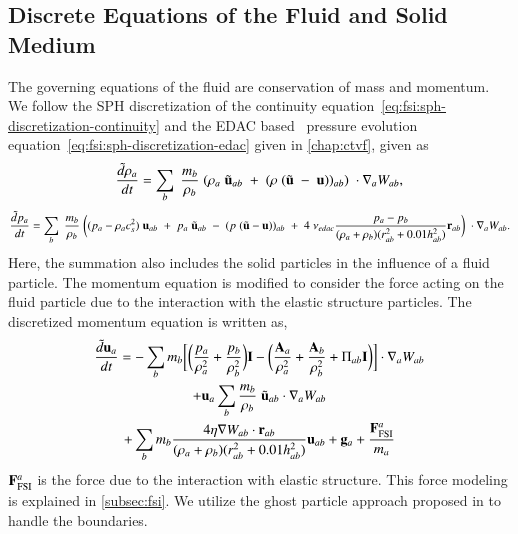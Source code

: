 \subsection{Discrete Equations of the Fluid and Solid Medium}\label{subsec:discrete-fluid}
The governing equations of the fluid are conservation of mass and momentum. We
follow the SPH discretization of the continuity
equation~\eqref{eq:fsi:sph-discretization-continuity} and the EDAC
based~\citep{PRKP:edac-sph-iccm2015} pressure evolution
equation~\eqref{eq:fsi:sph-discretization-edac} given in \cref{chap:ctvf}, given
as
\begin{equation}
  \label{eq:fsi:sph-discretization-continuity}
  \frac{\tilde{d}\rho_a}{dt} = \sum_{b} \; \frac{m_b}{\rho_{b}} \; (
  \rho_{a} \; \tilde{\mathbf{u}}_{ab} \; + \;
  (\rho \; (\tilde{\mathbf{u}} \; - \;
  \mathbf{u}))_{ab}) \; \cdot \nabla_{a} W_{ab},
\end{equation}
\begin{multline}
  \label{eq:fsi:sph-discretization-edac}
  \frac{\tilde{d}p_a}{dt} = \sum_{b} \; \frac{m_b}{\rho_{b}} \; \bigg(
  (p_{a} - \rho_{a} c_{s}^2) \; \mathbf{u}_{ab} \; + \;
  p_{a} \; \tilde{\mathbf{u}}_{ab} \; - \;
  (p \; (\tilde{\mathbf{u}} - \mathbf{u}))_{ab} \; + \;
  4 \; \nu_{edac}
  \frac{p_a - p_b}{(\rho_a + \rho_b) (r^2_{ab} + 0.01 h_{ab}^{2})} \mathbf{r}_{ab}
  \bigg) \; \cdot \nabla_{a} W_{ab}.
\end{multline}
%
Here, the summation also includes the solid particles in the influence of a
fluid particle. The momentum equation is modified to consider the force
acting on the fluid particle due to the interaction with the elastic structure
particles. The discretized momentum equation is written as,
\begin{multline}
  \label{eq:fsi:sph-momentum-fluid}
  \frac{\tilde{d}\mathbf{u}_{a}}{dt} = - \sum_{b} m_b \bigg[
  \bigg(\frac{p_a}{\rho_a^2} + \frac{p_b}{\rho_b^2}\bigg) \mathbf{I} -
  \bigg(\frac{\mathbf{A}_a}{\rho_a^2} + \frac{\mathbf{A}_b}{\rho_b^2} + \Pi_{ab}
  \mathbf{I} \bigg) \bigg]
  \cdot \nabla_{a} W_{ab} \\
  + \mathbf{u}_{a} \sum_{b} \frac{m_b}{\rho_{b}} \; \tilde{\mathbf{u}}_{ab} \cdot
  \nabla_{a} W_{ab} \\+ \sum_{b} m_b \frac{4 \eta \nabla W_{ab}\cdot
    \mathbf{r}_{ab}}{(\rho_a + \rho_b) (r_{ab}^2 + 0.01 h_{ab}^2)} \mathbf{u}_{ab} +
  \mathbf{g}_{a} + \frac{\mathbf{F}^a_{\text{FSI}}}{m_a}
\end{multline}
$\mathbf{F}^a_{\text{FSI}}$ is the force due to the interaction with elastic
structure. This force modeling is explained in \cref{subsec:fsi}. We utilize the
ghost particle approach proposed in \citep{Adami2012} to handle the boundaries.


